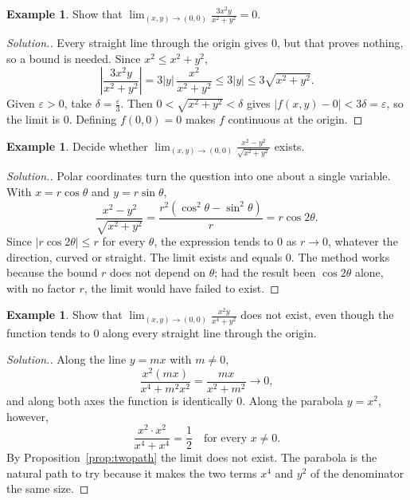 \documentclass[11pt,a4paper]{article}
\theoremstyle{definition}
\newtheorem{exa}[thm]{Example}
\newenvironment{solution}
  {\renewcommand{\qedsymbol}{}\begin{proof}[\textit{Solution}.]}
  {\end{proof}}
\begin{document}
\begin{exa}
\label{ex:limitexists}
Show that $\lim_{(x,y)\to(0,0)}\frac{3x^2y}{x^2+y^2} = 0$.
\end{exa}

\begin{solution}
Every straight line through the origin gives $0$, but that proves nothing, so a
bound is needed. Since $x^2\leq x^2+y^2$,
\[\left|\frac{3x^2y}{x^2+y^2}\right| = 3|y|\,\frac{x^2}{x^2+y^2}\leq 3|y|\leq
3\sqrt{x^2+y^2} .\]
Given $\varepsilon>0$, take $\delta = \frac{\varepsilon}{3}$. Then
$0<\sqrt{x^2+y^2}<\delta$ gives $|f(x,y) - 0|<3\delta = \varepsilon$, so the limit
is $0$. Defining $f(0,0) = 0$ makes $f$ continuous at the origin.
\end{solution}

\begin{exa}
\label{ex:polar}
Decide whether $\lim_{(x,y)\to(0,0)}\frac{x^2-y^2}{\sqrt{x^2+y^2}}$ exists.
\end{exa}

\begin{solution}
Polar coordinates turn the question into one about a single variable. With
$x = r\cos\theta$ and $y = r\sin\theta$,
\[\frac{x^2-y^2}{\sqrt{x^2+y^2}} = \frac{r^2(\cos^2\theta - \sin^2\theta)}{r} =
r\cos 2\theta .\]
Since $|r\cos 2\theta|\leq r$ for every $\theta$, the expression tends to $0$ as
$r\to 0$, whatever the direction, curved or straight. The limit exists and
equals $0$. The method works because the bound $r$ does not depend on $\theta$;
had the result been $\cos 2\theta$ alone, with no factor $r$, the limit would
have failed to exist.
\end{solution}

\begin{exa}
\label{ex:parabolapath}
Show that $\lim_{(x,y)\to(0,0)}\frac{x^2y}{x^4+y^2}$ does not exist, even though
the function tends to $0$ along every straight line through the origin.
\end{exa}

\begin{solution}
Along the line $y = mx$ with $m\neq 0$,
\[\frac{x^2(mx)}{x^4 + m^2x^2} = \frac{mx}{x^2+m^2}\to 0 ,\]
and along both axes the function is identically $0$. Along the parabola
$y = x^2$, however,
\[\frac{x^2\cdot x^2}{x^4 + x^4} = \frac12\quad\text{for every } x\neq 0 .\]
By Proposition~\ref{prop:twopath} the limit does not exist. The parabola is the
natural path to try because it makes the two terms $x^4$ and $y^2$ of the
denominator the same size.
\end{solution}
\end{document}

